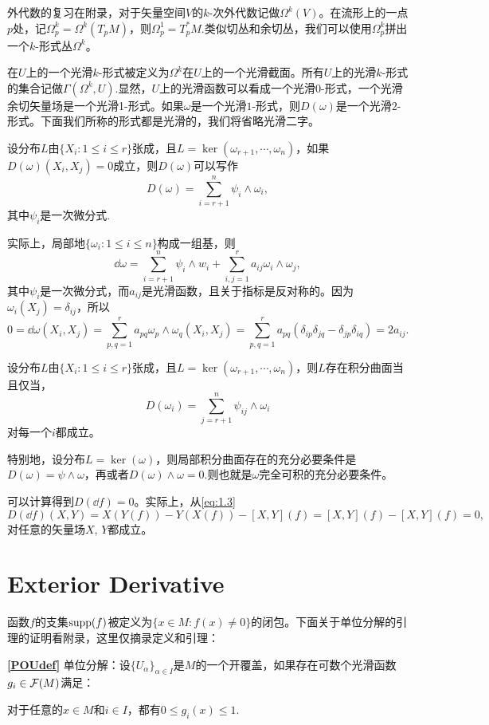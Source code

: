\para 外代数的复习在附录，对于矢量空间$V$的$k$-次外代数记做$\Omega^k(V)$。在流形上的一点$p$处，记$\Omega_p^k=\Omega^k(T_pM)$，则$\Omega_p^1=T_p^*M$.类似切丛和余切丛，我们可以使用$\Omega_p^k$拼出一个$k$-形式丛$\Omega^k$。

\para 在$U$上的一个光滑$k$-形式被定义为$\Omega^k$在$U$上的一个光滑截面。所有$U$上的光滑$k$-形式的集合记做$\Gamma(\Omega^k,U)$.显然，$U$上的光滑函数可以看成一个光滑$0$-形式，一个光滑余切矢量场是一个光滑1-形式。如果$\omega$是一个光滑$1$-形式，则$D(\omega)$是一个光滑$2$-形式。下面我们所称的形式都是光滑的，我们将省略光滑二字。

\para 设分布$L$由$\{X_i:1\leq i \leq r\}$张成，且$L=\ker(\omega_{r+1},\cdots,\omega_n)$，如果$D(\omega)(X_i,X_j)=0$成立，则$D(\omega)$可以写作\[
	D(\omega)=\sum_{i=r+1}^n \psi_i\wedge \omega_i,
\]
其中$\psi_i$是一次微分式.

实际上，局部地$\{\omega_i:1\leq i\leq n\}$构成一组基，则
\[
	\dd \omega = \sum_{i=r+1}^n \psi_i\wedge w_i +\sum_{i,j=1}^r a_{ij}\omega_i\wedge \omega_j,
\]
其中$\psi_i$是一次微分式，而$a_{ij}$是光滑函数，且关于指标是反对称的。因为$\omega_i(X_j)=\delta_{ij}$，所以
\[
	0=\dd \omega(X_i,X_j)=\sum_{p,q=1}^r a_{pq}\omega_p\wedge \omega_q(X_i,X_j)=\sum_{p,q=1}^r a_{pq}(\delta_{ip}\delta_{jq}-\delta_{jp}\delta_{iq})=2a_{ij}.
\]

\para 设分布$L$由$\{X_i:1\leq i \leq r\}$张成，且$L=\ker(\omega_{r+1},\cdots,\omega_n)$，则$L$存在积分曲面当且仅当，
\[
	D(\omega_i)=\sum_{j=r+1}^n \psi_{ij}\wedge \omega_i
\]
对每一个$i$都成立。

\para 特别地，设分布$L=\ker(\omega)$，则局部积分曲面存在的充分必要条件是$D(\omega)=\psi\wedge \omega$，再或者$D(\omega)\wedge \omega=0$.则也就是$\omega$完全可积的充分必要条件。

\para \label{dd=0}可以计算得到$D(\dd f)=0$。实际上，从\eqref{eq:1.3}
\[
	D(\dd f)(X,Y)=X(Y(f))-Y(X(f))-[X,Y](f)=[X,Y](f)-[X,Y](f)=0,
\]
对任意的矢量场$X$, $Y$都成立。

\section{Exterior Derivative}

函数$f$的支集$\operatorname{supp}(f)$被定义为$\{x\in M:f(x)\neq 0\}$的闭包。下面关于单位分解的引理的证明看附录，这里仅摘录定义和引理：

\textbf{\eqref{POUdef}} 单位分解：设$\{U_\alpha\}_{\alpha\in I}$是$M$的一个开覆盖，如果存在可数个光滑函数$g_i\in \mathcal{F}(M)$满足：

 对于任意的$x\in M$和$i\in I$，都有$0\leq g_i(x)\leq 1$.

